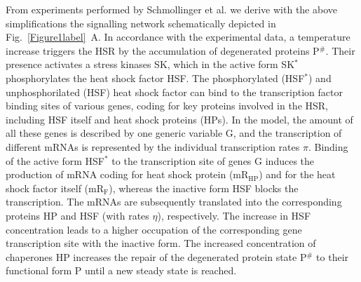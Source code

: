 \documentclass[oneside, 10pt, a4paper, twocolumn]{article}
\begin{document}
From  experiments performed by Schmollinger et al. \cite{Schmollinger2013} we derive with the above simplifications
the signalling network schematically depicted in Fig.~\ref{Figure1label}~A. %
In accordance with the experimental data, a temperature
increase triggers the HSR by the accumulation of
degenerated proteins P$^\#$. Their presence activates a stress
kinases SK, which in the active form SK$^*$ phosphorylates the heat
shock factor HSF. The phosphorylated (HSF$^*$) and unphosphorilated
(HSF) heat shock factor can bind to the transcription factor binding
sites of various genes, coding for key proteins involved in the HSR,
including HSF itself and heat shock proteins (HPs). 
In the model, the amount of all these genes is
described by one generic variable G, and the transcription of different mRNAs
is represented by the individual transcription rates $\pi$. Binding
of the active form HSF$^*$ to the transcription site of genes G induces the production of mRNA
coding for heat shock protein (mR$_{\text{HP}}$) and for the heat
shock factor itself (mR$_{\text{F}}$), whereas the inactive form HSF
blocks the transcription. The mRNAs are subsequently translated into
the corresponding proteins HP and HSF (with rates $\eta$),
respectively. The increase in HSF concentration leads to a higher
occupation of the corresponding gene transcription site with the inactive form. The increased
concentration of chaperones HP increases the repair of the
degenerated protein state P$^\#$ to their functional form P until a new
steady state is reached.
\end{document}
